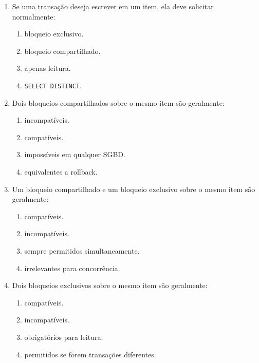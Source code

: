 \documentclass[12pt,a4paper]{article}
\begin{document}
\begin{enumerate}[label=\textbf{Q\arabic*.}]
\begin{enumerate}[label=\alph*)]
    \item bloqueio exclusivo.
    \item bloqueio compartilhado.
    \item remoção do bloqueio.
    \item \texttt{ROLLBACK}.
\end{enumerate}

\item Se uma transação deseja escrever em um item, ela deve solicitar normalmente:

\begin{enumerate}[label=\alph*)]
    \item bloqueio exclusivo.
    \item bloqueio compartilhado.
    \item apenas leitura.
    \item \texttt{SELECT DISTINCT}.
\end{enumerate}

\item Dois bloqueios compartilhados sobre o mesmo item são geralmente:

\begin{enumerate}[label=\alph*)]
    \item incompatíveis.
    \item compatíveis.
    \item impossíveis em qualquer SGBD.
    \item equivalentes a rollback.
\end{enumerate}

\item Um bloqueio compartilhado e um bloqueio exclusivo sobre o mesmo item são geralmente:

\begin{enumerate}[label=\alph*)]
    \item compatíveis.
    \item incompatíveis.
    \item sempre permitidos simultaneamente.
    \item irrelevantes para concorrência.
\end{enumerate}

\item Dois bloqueios exclusivos sobre o mesmo item são geralmente:

\begin{enumerate}[label=\alph*)]
    \item compatíveis.
    \item incompatíveis.
    \item obrigatórios para leitura.
    \item permitidos se forem transações diferentes.
\end{enumerate}


\end{enumerate}
\end{document}

